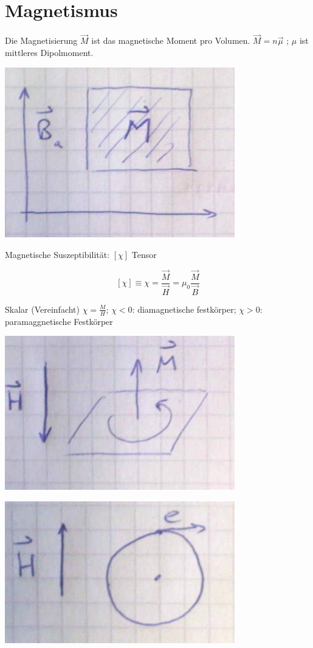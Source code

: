 


\tableofcontents
\setcounter{chapter}{11}
\chapter{Magnetismus}

Die Magnetisierung \(\vec M\) ist das magnetische Moment pro Volumen. \(\vec M = n\vec\mu\) ; \(\mu\) ist mittleres Dipolmoment.


\includegraphics[width=0.75\textwidth]{kap12_01.png}


Magnetische Suszeptibilität: \([\chi]\) Tensor

\[[\chi]\equiv \chi = \frac{\vec M}{\vec H} = \mu_0\frac{\vec M}{\vec B} \]

Skalar (Vereinfacht) \(\chi= \frac{M}{H}\); \(\chi < 0 \): diamagnetische festkörper; \(\chi>0\): paramaggnetische Festkörper

\includegraphics[width=0.75\textwidth]{kap12_02.png}


\includegraphics[width=0.75\textwidth]{kap12_03.png}


